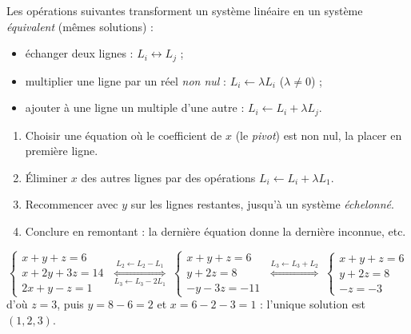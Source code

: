 \begin{propriete}
Les opérations suivantes transforment un système linéaire en un système
\emph{équivalent} (mêmes solutions) :
\begin{itemize}[label={\color{otNavy}\textbullet},leftmargin=1.4em,itemsep=0.6mm,topsep=0.8mm]
  \item échanger deux lignes : $L_i\leftrightarrow L_j$ ;
  \item multiplier une ligne par un réel \emph{non nul} : $L_i\leftarrow\lambda L_i$ ($\lambda\neq0$) ;
  \item ajouter à une ligne un multiple d'une autre : $L_i\leftarrow L_i+\lambda L_j$.
\end{itemize}
\end{propriete}

\begin{savoirfaire}
\begin{enumerate}[label=\otLabel{\arabic*.},leftmargin=1.6em,itemsep=0.6mm,topsep=0.5mm]
  \item Choisir une équation où le coefficient de $x$ (le \emph{pivot}) est non nul,
    la placer en première ligne.
  \item Éliminer $x$ des autres lignes par des opérations $L_i\leftarrow L_i+\lambda L_1$.
  \item Recommencer avec $y$ sur les lignes restantes, jusqu'à un système \emph{échelonné}.
  \item Conclure en remontant : la dernière équation donne la dernière inconnue, etc.
\end{enumerate}
\end{savoirfaire}

\begin{exemple}
\[
  \begin{cases} x+y+z=6\\ x+2y+3z=14\\ 2x+y-z=1 \end{cases}
  \;\underset{L_3\leftarrow L_3-2L_1}{\overset{L_2\leftarrow L_2-L_1}{\iff}}\;
  \begin{cases} x+y+z=6\\ y+2z=8\\ -y-3z=-11 \end{cases}
  \;\overset{L_3\leftarrow L_3+L_2}{\iff}\;
  \begin{cases} x+y+z=6\\ y+2z=8\\ -z=-3 \end{cases}
\]
d'où $z=3$, puis $y=8-6=2$ et $x=6-2-3=1$ : l'unique solution est $(1,2,3)$.
\end{exemple}

